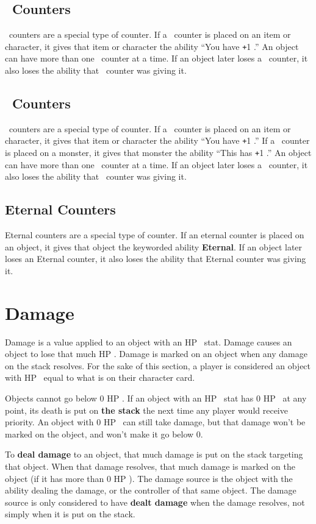 \documentclass[
  fontsize=10pt,
  paper=a5,
  version=last,
  chapterprefix=true,
  bindingoffset=5mm,
  ]{scrbook}
\newcommand*{\inlineicon}[1]{%
    \raisebox{-.3\baselineskip}{%
        \smash{%
            \texttt{[image: \#1]}%
        }%
    }%
}
\newcommand{\heart}{\inlineicon{./assets/ms-heart.png}}
\newcommand{\sword}{\inlineicon{./assets/ms-sword.png}}
\def\plus{\texttt{+}}
\begin{document}
    \subsection*{\heart\ Counters}
    \heart\ counters are a special type of counter. If a \heart\ counter is placed on an item or character, it gives that item or character the ability “You have \plus1\heart.” An object can have more than one \heart\ counter at a time. If an object later loses a \heart\ counter, it also loses the ability that \heart\ counter was giving it.
    \subsection*{\sword\ Counters}
    \sword\ counters are a special type of counter. If a \sword\ counter is placed on an item or character, it gives that item or character the ability “You have \plus1\sword.” If a \sword\ counter is placed on a monster, it gives that monster the ability “This has \plus1\sword.” An object can have more than one \sword\ counter at a time. If an object later loses a \sword\ counter, it also loses the ability that \sword\ counter was giving it.
    \subsection*{Eternal Counters}
    Eternal counters are a special type of counter. If an eternal counter is placed on an object, it gives that object the keyworded ability \textbf{Eternal}. If an object later loses an Eternal counter, it also loses the ability that Eternal counter was giving it.
    \section{Damage}
    Damage is a value applied to an object with an HP\heart\ stat. Damage causes an object to lose that much HP\heart. Damage is marked on an object when any damage on the stack resolves. For the sake of this section, a player is considered an object with HP\heart\ equal to what is on their character card.

    Objects cannot go below 0 HP\heart. If an object with an HP\heart\ stat has 0 HP\heart\ at any point, its death is put on \textbf{the stack} the next time any player would receive priority. An object with 0 HP\heart\ can still take damage, but that damage won’t be marked on the object, and won’t make it go below 0.

    To \textbf{deal damage} to an object, that much damage is put on the stack targeting that object. When that damage resolves, that much damage is marked on the object (if it has more than 0 HP\heart). The damage source is the object with the ability dealing the damage, or the controller of that same object. The damage source is only considered to have \textbf{dealt damage} when the damage resolves, not simply when it is put on the stack.
\end{document}
